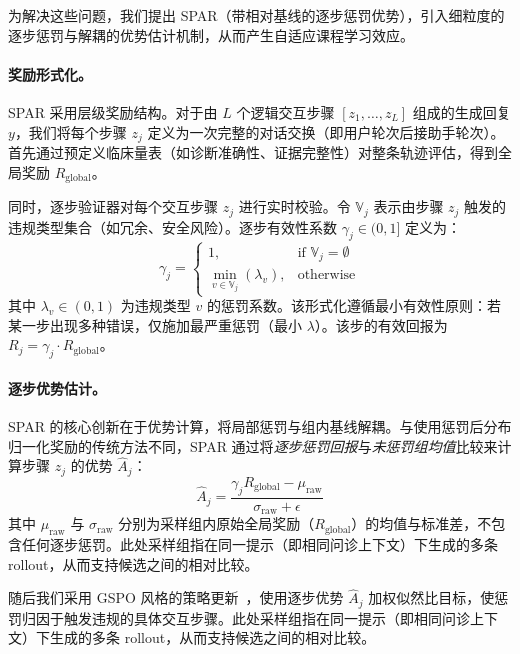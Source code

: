 为解决这些问题，我们提出 SPAR（带相对基线的逐步惩罚优势），引入细粒度的逐步惩罚与解耦的优势估计机制，从而产生自适应课程学习效应。

\paragraph{奖励形式化。}
SPAR 采用层级奖励结构。对于由 $L$ 个逻辑交互步骤 $[z_1, \dots, z_L]$ 组成的生成回复 $y$，我们将每个步骤 $z_j$ 定义为一次完整的对话交换（即用户轮次后接助手轮次）。首先通过预定义临床量表（如诊断准确性、证据完整性）对整条轨迹评估，得到全局奖励 $R_{\text{global}}$。

同时，逐步验证器对每个交互步骤 $z_j$ 进行实时校验。令 $\mathbb{V}_j$ 表示由步骤 $z_j$ 触发的违规类型集合（如冗余、安全风险）。逐步有效性系数 $\gamma_j \in (0, 1]$ 定义为：
\begin{equation}
    \gamma_j =
    \begin{cases}
        1, & \text{if } \mathbb{V}_j = \emptyset \\
        \min\limits_{v \in \mathbb{V}_j} (\lambda_v), & \text{otherwise}
    \end{cases}
\end{equation}
其中 $\lambda_v \in (0, 1)$ 为违规类型 $v$ 的惩罚系数。该形式化遵循最小有效性原则：若某一步出现多种错误，仅施加最严重惩罚（最小 $\lambda$）。该步的有效回报为 $R_j = \gamma_j \cdot R_{\text{global}}$。


\paragraph{逐步优势估计。}
SPAR 的核心创新在于优势计算，将局部惩罚与组内基线解耦。与使用惩罚后分布归一化奖励的传统方法不同，SPAR 通过将\textit{逐步惩罚回报}与\textit{未惩罚组均值}比较来计算步骤 $z_j$ 的优势 $\hat{A}_{j}$：
\begin{equation}
    \hat{A}_{j} = \frac{\gamma_{j} R_{\text{global}} - \mu_{\text{raw}}}{\sigma_{\text{raw}} + \epsilon}
\end{equation}
其中 $\mu_{\text{raw}}$ 与 $\sigma_{\text{raw}}$ 分别为采样组内原始全局奖励（$R_{\text{global}}$）的均值与标准差，不包含任何逐步惩罚。此处采样组指在同一提示（即相同问诊上下文）下生成的多条 rollout，从而支持候选之间的相对比较。

随后我们采用 GSPO 风格的策略更新~\cite{DBLP:journals/corr/abs-2507-18071}，使用逐步优势 $\hat{A}_j$ 加权似然比目标，使惩罚归因于触发违规的具体交互步骤。此处采样组指在同一提示（即相同问诊上下文）下生成的多条 rollout，从而支持候选之间的相对比较。

